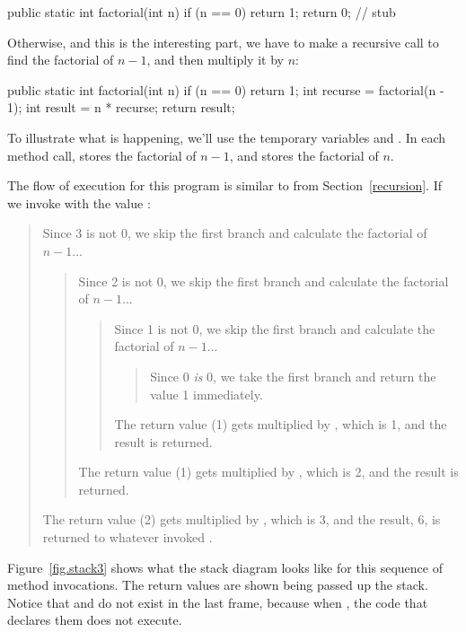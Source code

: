 \begin{code}
public static int factorial(int n) {
    if (n == 0) {
        return 1;
    }
    return 0;  // stub
}
\end{code}

Otherwise, and this is the interesting part, we have to make a recursive call to find the factorial of $n-1$, and then multiply it by $n$:

\begin{code}
public static int factorial(int n) {
    if (n == 0) {
        return 1;
    }
    int recurse = factorial(n - 1);
    int result = n * recurse;
    return result;
}
\end{code}

To illustrate what is happening, we'll use the temporary variables  and .
In each method call,  stores the factorial of $n - 1$, and  stores the factorial of $n$.

The flow of execution for this program is similar to  from Section~\ref{recursion}.
If we invoke  with the value :

\vspace{-1ex}
\begin{quote}
Since 3 is not 0, we skip the first branch and calculate the factorial of $n-1$...
\begin{quote}
Since 2 is not 0, we skip the first branch and calculate the factorial of $n-1$...
\begin{quote}
Since 1 is not 0, we skip the first branch and calculate the factorial of $n-1$...
\begin{quote}
Since 0 {\em is} 0, we take the first branch and return the value 1 immediately.
\end{quote}
The return value (1) gets multiplied by , which is 1, and the result is returned.
\end{quote}
The return value (1) gets multiplied by , which is 2, and the result is returned.
\end{quote}
The return value (2) gets multiplied by , which is 3, and the result, 6, is returned to whatever invoked .
\end{quote}
\vspace{-1ex}


Figure~\ref{fig.stack3} shows what the stack diagram looks like for this sequence of method invocations.
The return values are shown being passed up the stack.
Notice that  and  do not exist in the last frame, because when , the code that declares them does not execute.

